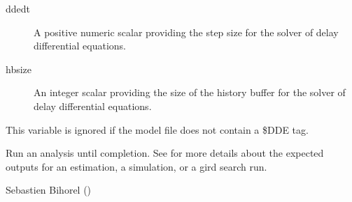 \begin{Arguments}
\begin{ldescription}
\begin{description}
\item[ddedt] A positive numeric scalar providing the step size for the 
solver of delay differential equations.
\item[hbsize] An integer scalar providing the size of the history buffer for
the solver of delay differential equations.

\end{description}

This variable is ignored if the model file does not contain a \$DDE tag.

\end{ldescription}
\end{Arguments}
%
\begin{Value}
Run an analysis until completion. See 
 for more details about the
expected outputs for an estimation, a simulation, or a gird search run.
\end{Value}
%
\begin{Author}\relax
Sebastien Bihorel ()
\end{Author}
%
\begin{SeeAlso}\relax
{}
\end{SeeAlso}
